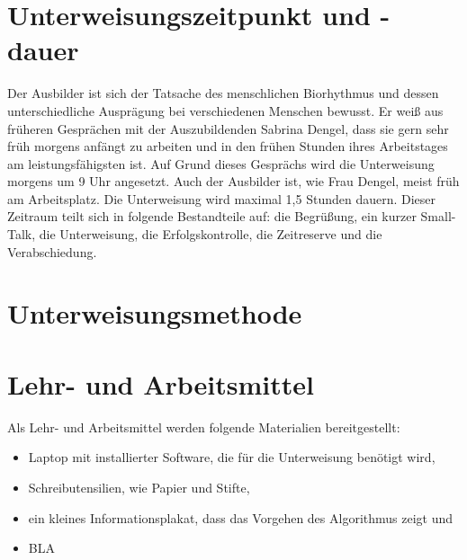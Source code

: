 \section{Unterweisungszeitpunkt und -dauer}
Der Ausbilder ist sich der Tatsache des menschlichen Biorhythmus und dessen unterschiedliche Ausprägung bei verschiedenen Menschen bewusst. Er weiß aus früheren Gesprächen mit der Auszubildenden Sabrina Dengel, dass sie gern sehr früh morgens anfängt zu arbeiten und in den frühen Stunden ihres Arbeitstages am leistungsfähigsten ist. Auf Grund dieses Gesprächs wird die Unterweisung morgens um 9 Uhr angesetzt. Auch der Ausbilder ist, wie Frau Dengel, meist früh am Arbeitsplatz. Die Unterweisung wird maximal 1,5 Stunden dauern. Dieser Zeitraum teilt sich in folgende Bestandteile auf: die Begrüßung, ein kurzer Small-Talk, die Unterweisung, die Erfolgskontrolle, die Zeitreserve und die Verabschiedung.   

\section{Unterweisungsmethode}

\section{Lehr- und Arbeitsmittel}
Als Lehr- und Arbeitsmittel werden folgende Materialien bereitgestellt: 
\begin{itemize}
	\item Laptop mit installierter Software, die für die Unterweisung benötigt wird,
	\item Schreibutensilien, wie Papier und Stifte, 
	\item ein kleines Informationsplakat, dass das Vorgehen des Algorithmus zeigt und
	\item BLA
\end{itemize}



